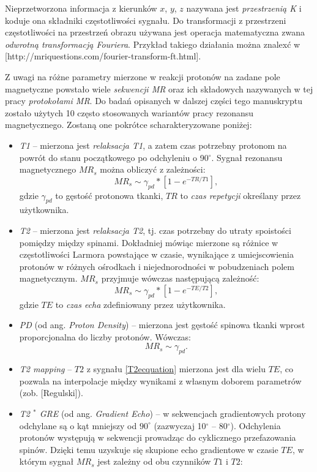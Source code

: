 Nieprzetworzona informacja z kierunków $x$, $y$, $z$ nazywana jest \textit{przestrzenią K} i koduje ona składniki częstotliwości sygnału. Do transformacji z przestrzeni częstotliwości na przestrzeń obrazu używana jest operacja matematyczna zwana \textit{odwrotną transformacją Fouriera}. Przykład takiego działania można znalexć w [http://mriquestions.com/fourier-transform-ft.html].

Z uwagi na różne parametry mierzone w reakcji protonów na zadane pole magnetyczne powstało wiele \textit{sekwencji MR} oraz ich składowych nazywanych w tej pracy \textit{protokołami MR}. Do badań opisanych w dalszej części tego manuskryptu zostało użytych 10 często stosowanych wariantów pracy rezonansu magnetycznego. Zostaną one pokrótce scharakteryzowane poniżej:
\begin{itemize}
	\item \textit{T1} -- mierzona jest \textit{relaksacja T1}, a zatem czas potrzebny protonom na powrót do stanu początkowego po odchyleniu o 90$^\circ$. Sygnał rezonansu magnetycznego $MR_s$ można obliczyć z zależności:
	\begin{equation}
		MR_s \sim \gamma_{pd} \ast [1-e^{-TR/T1}],
	\end{equation}
	gdzie $\gamma_{pd}$ to gęstość protonowa tkanki, $TR$ to \textit{czas repetycji} określany przez użytkownika.
	\item \textit{T2} -- mierzona jest \textit{relaksacja T2}, tj. czas potrzebny do utraty spoistości pomiędzy między spinami. Dokładniej mówiąc mierzone są różnice w częstotliwości Larmora powstające w czasie, wynikające z umiejscowienia protonów w różnych ośrodkach i niejednorodności w pobudzeniach polem magnetycznym. $MR_s$ przyjmuje wówczas następującą zależność:
	\begin{equation}
	\label{T2ecquation}
	MR_s \sim \gamma_{pd} \ast [1-e^{-TE/T2}],
	\end{equation}
	gdzie $TE$ to \textit{czas echa} zdefiniowany przez użytkownika.
	\item \textit{PD} (od ang. \textit{Proton Density}) -- mierzona jest gęstość spinowa tkanki wprost proporcjonalna do liczby protonów. Wówczas:
	\begin{equation}
	MR_s \sim \gamma_{pd}.
	\end{equation}
	\item \textit{T2 mapping} -- $T2$ z sygnału \ref{T2ecquation} mierzona jest dla wielu $TE$, co pozwala na interpolacje między wynikami z własnym doborem parametrów (zob. [Regulski]).
	\item \textit{T2 $^\ast$ GRE} (od ang. \textit{Gradient Echo}) -- w sekwencjach gradientowych protony odchylane są o kąt mniejszy od $90^\circ$ (zazwyczaj 10$^\circ$ -- 80$^\circ$). Odchylenia protonów występują w sekwencji prowadząc do cyklicznego przefazowania spinów. Dzięki temu uzyskuje się skupione echo gradientowe w czasie $TE$, w którym sygnał $MR_s$ jest zależny od obu czynników $T1$ i $T2$:

\end{itemize}
